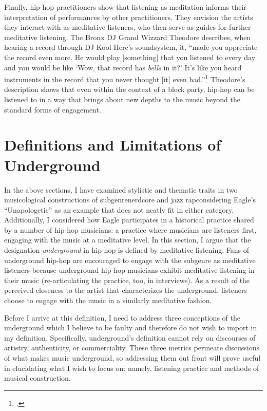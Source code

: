 Finally, hip-hop practitioners show that listening as meditation informs their interpretation of performances 
by other practitioners. They envision the artists they interact with as meditative listeners, who then serve
as guides for further meditative listening. The Bronx DJ Grand Wizzard Theodore describes, when hearing a 
record through DJ Kool Herc's soundsystem, it, ``made you appreciate the record even more. He would play 
[something] that you listened to every day and you would be like `Wow, that record has \emph{bells} in it?' 
It's like you heard instruments in the record that you never thought [it] even had.''\footnote{
    \autocite[139]{christabronGlassHiphopProduction2015}.} 
Theodore's description shows that even within the context of a block party, hip-hop can be listened to
in a way that brings about new depths to the music beyond the standard forms of engagement.

\section{Definitions and Limitations of Underground} \label{undergrounddeflims}

In the above sections, I have examined stylistic and thematic traits in two musicological 
constructions  of subgenre\textemdash nerdcore and jazz rap\textemdash considering Eagle's
``Unapologetic'' as an example that does not neatly fit in either category. Additionally, I
considered how Eagle participates in a historical practice shared by a number of hip-hop 
musicians: a practice where musicians are listeners first, engaging with the music at a meditative
level. In this section, I argue that the designation \emph{underground} in hip-hop is defined 
by meditative listening. Fans of underground hip-hop are encouraged to engage with the subgenre 
as meditative listeners because underground hip-hop musicians exhibit meditative listening in
their music (re-articulating the practice, too, in interviews). As a result of the perceived 
closeness to the artist that characterizes the underground, listeners choose to engage with
the music in a similarly meditative fashion.

Before I arrive at this definition, I need to address three conceptions of the underground 
which I believe to be faulty and therefore do not wish to import in my definition. Specifically,
underground's definition cannot rely on discourses of artistry, authenticity, or commerciality.
These three metrics permeate discussions of what makes music underground, so addressing them out
front will prove useful in elucidating what I wish to focus on: namely, listening practice and
methods of musical construction.

